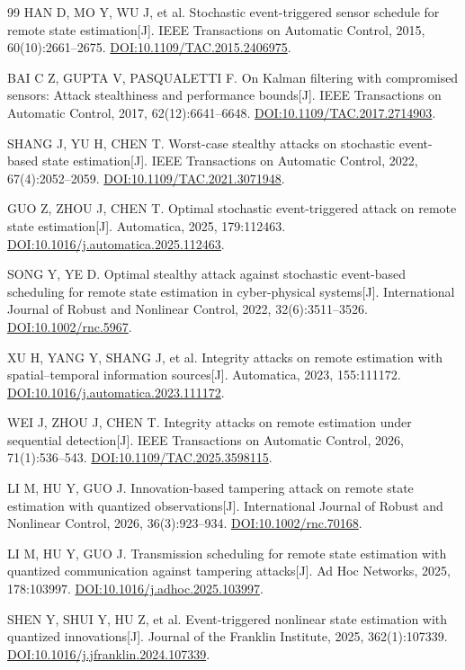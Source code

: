 \begin{thebibliography}{99}
HAN D, MO Y, WU J, et al. Stochastic event-triggered sensor schedule for remote state estimation[J].
IEEE Transactions on Automatic Control, 2015, 60(10):2661--2675.
\href{https://doi.org/10.1109/TAC.2015.2406975}{DOI:10.1109/TAC.2015.2406975}.

BAI C Z, GUPTA V, PASQUALETTI F. On Kalman filtering with compromised sensors: Attack stealthiness and performance bounds[J].
IEEE Transactions on Automatic Control, 2017, 62(12):6641--6648.
\href{https://doi.org/10.1109/TAC.2017.2714903}{DOI:10.1109/TAC.2017.2714903}.

SHANG J, YU H, CHEN T. Worst-case stealthy attacks on stochastic event-based state estimation[J].
IEEE Transactions on Automatic Control, 2022, 67(4):2052--2059.
\href{https://doi.org/10.1109/TAC.2021.3071948}{DOI:10.1109/TAC.2021.3071948}.

GUO Z, ZHOU J, CHEN T. Optimal stochastic event-triggered attack on remote state estimation[J].
Automatica, 2025, 179:112463.
\href{https://doi.org/10.1016/j.automatica.2025.112463}{DOI:10.1016/j.automatica.2025.112463}.

SONG Y, YE D. Optimal stealthy attack against stochastic event-based scheduling for remote state estimation in cyber-physical systems[J].
International Journal of Robust and Nonlinear Control, 2022, 32(6):3511--3526.
\href{https://doi.org/10.1002/rnc.5967}{DOI:10.1002/rnc.5967}.

XU H, YANG Y, SHANG J, et al. Integrity attacks on remote estimation with spatial--temporal information sources[J].
Automatica, 2023, 155:111172.
\href{https://doi.org/10.1016/j.automatica.2023.111172}{DOI:10.1016/j.automatica.2023.111172}.

WEI J, ZHOU J, CHEN T. Integrity attacks on remote estimation under sequential detection[J].
IEEE Transactions on Automatic Control, 2026, 71(1):536--543.
\href{https://doi.org/10.1109/TAC.2025.3598115}{DOI:10.1109/TAC.2025.3598115}.

LI M, HU Y, GUO J. Innovation-based tampering attack on remote state estimation with quantized observations[J].
International Journal of Robust and Nonlinear Control, 2026, 36(3):923--934.
\href{https://doi.org/10.1002/rnc.70168}{DOI:10.1002/rnc.70168}.

LI M, HU Y, GUO J. Transmission scheduling for remote state estimation with quantized communication against tampering attacks[J].
Ad Hoc Networks, 2025, 178:103997.
\href{https://doi.org/10.1016/j.adhoc.2025.103997}{DOI:10.1016/j.adhoc.2025.103997}.

SHEN Y, SHUI Y, HU Z, et al. Event-triggered nonlinear state estimation with quantized innovations[J].
Journal of the Franklin Institute, 2025, 362(1):107339.
\href{https://doi.org/10.1016/j.jfranklin.2024.107339}{DOI:10.1016/j.jfranklin.2024.107339}.

\end{thebibliography}
